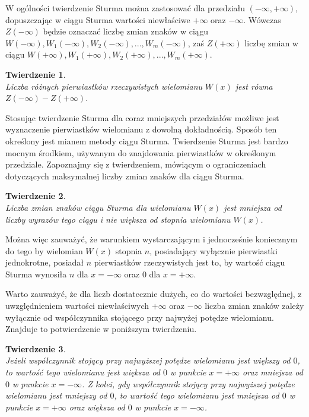 \documentclass[twoside,a4paper]{book}
\newtheorem{theorem}{Twierdzenie}
\begin{document}
W ogólności twierdzenie Sturma można zastosować dla przedziału $(-\infty,+\infty)$, dopuszczając w ciągu Sturma wartości niewłaściwe $+\infty$ oraz $-\infty$. Wówczas $Z(-\infty)$ będzie oznaczać liczbę zmian znaków w ciągu $W(-\infty), W_1(-\infty), W_2(-\infty),..., W_m(-\infty)$, zaś $Z(+\infty)$ liczbę zmian w ciągu $W(+\infty), W_1(+\infty), W_2(+\infty),..., W_m(+\infty)$.

\begin{theorem}
	$ $ \\
	Liczba różnych pierwiastków rzeczywistych wielomianu $W(x)$ jest równa $Z(-\infty)-Z(+\infty)$.
\end{theorem}

Stosując twierdzenie Sturma dla coraz mniejszych przedziałów możliwe jest wyznaczenie pierwiastków wielomianu z dowolną dokładnością. Sposób ten określony jest mianem metody ciągu Sturma.
Twierdzenie Sturma jest bardzo mocnym środkiem, używanym do znajdowania pierwiastków w określonym przedziale. Zapoznajmy się z twierdzeniem, mówiącym o ograniczeniach dotyczących maksymalnej liczby zmian znaków dla ciągu Sturma.

\begin{theorem}
	$ $ \\
	Liczba zmian znaków ciągu Sturma dla wielomianu $W(x)$ jest mniejsza od liczby wyrazów tego ciągu i nie większa od stopnia wielomianu $W(x)$.
\end{theorem}

Można więc zauważyć, że warunkiem wystarczającym i jednocześnie koniecznym do tego by wielomian $W(x)$ stopnia $n$, posiadający wyłącznie pierwiastki jednokrotne, posiadał $n$ pierwiastków rzeczywistych jest to, by wartość ciągu Sturma wynosiła $n$ dla $x=-\infty$ oraz $0$ dla $x=+\infty$. 

Warto zauważyć, że dla liczb dostatecznie dużych, co do wartości bezwzględnej, z uwzględnieniem wartości niewłaściwych $+\infty$ oraz $-\infty$ liczba zmian znaków zależy wyłącznie od współczynnika stojącego przy najwyżej potędze wielomianu. Znajduje to potwierdzenie w poniższym twierdzeniu.

\begin{theorem}
	$ $ \\
	Jeżeli współczynnik stojący przy najwyższej potędze wielomianu jest większy od $0$, to wartość tego wielomianu jest większa od $0$ w punkcie $x=+\infty$ oraz mniejsza od $0$ w punkcie $x=-\infty$.
	Z kolei, gdy współczynnik stojący przy najwyższej potędze wielomianu jest mniejszy od $0$, to wartość tego wielomianu jest mniejsza od $0$ w punkcie $x=+\infty$ oraz większa od $0$ w punkcie $x=-\infty$.
\end{theorem}
\end{document}
